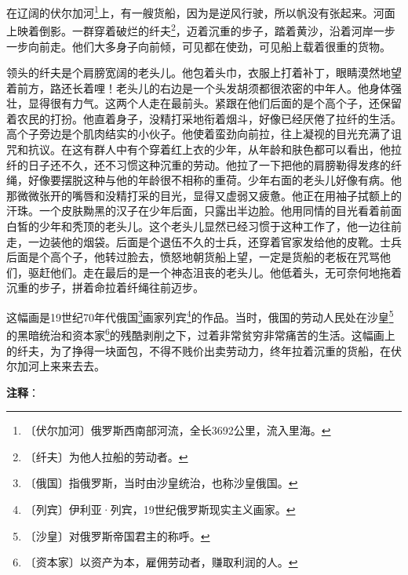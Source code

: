 \documentclass[12pt,UTF-8,openany]{ctexbook}
\begin{document}
\begin{Large}
    
    在辽阔的伏尔加河\footnote{〔伏尔加河〕俄罗斯西南部河流，全长3692公里，流入里海。}上，有一艘货船，因为是逆风行驶，所以帆没有张起来。河面上映着倒影。一群穿着破烂的纤夫\footnote{〔纤夫〕为他人拉船的劳动者。}，迈着沉重的步子，踏着黄沙，沿着河岸一步一步向前走。他们大多身子向前倾，可见都在使劲，可见船上载着很重的货物。
    
    领头的纤夫是个肩膀宽阔的老头儿。他包着头巾，衣服上打着补丁，眼睛漠然地望着前方，路还长着哩！老头儿的右边是一个头发胡须都很浓密的中年人。他身体强壮，显得很有力气。这两个人走在最前头。紧跟在他们后面的是个高个子，还保留着农民的打扮。他直着身子，没精打采地衔着烟斗，好像已经厌倦了拉纤的生活。高个子旁边是个肌肉结实的小伙子。他使着蛮劲向前拉，往上凝视的目光充满了诅咒和抗议。在这有群人中有个穿着红上衣的少年，从年龄和肤色都可以看出，他拉纤的日子还不久，还不习惯这种沉重的劳动。他拉了一下把他的肩膀勒得发疼的纤绳，好像要摆脱这种与他的年龄很不相称的重荷。少年右面的老头儿好像有病。他那微微张开的嘴唇和没精打采的目光，显得又虚弱又疲惫。他正在用袖子拭额上的汗珠。一个皮肤黝黑的汉子在少年后面，只露出半边脸。他用同情的目光看着前面白皙的少年和秃顶的老头儿。这个老头儿显然已经习惯于这种工作了，他一边往前走，一边装他的烟袋。后面是个退伍不久的士兵，还穿着官家发给他的皮靴。士兵后面是个高个子，他转过脸去，愤怒地朝货船上望，一定是货船的老板在咒骂他们，驱赶他们。走在最后的是一个神态沮丧的老头儿。他低着头，无可奈何地拖着沉重的步子，拼着命拉着纤绳往前迈步。
    
    这幅画是19世纪70年代俄国\footnote{〔俄国〕指俄罗斯，当时由沙皇统治，也称沙皇俄国。}画家列宾\footnote{〔列宾〕伊利亚·列宾，19世纪俄罗斯现实主义画家。}的作品。当时，俄国的劳动人民处在沙皇\footnote{〔沙皇〕对俄罗斯帝国君主的称呼。}的黑暗统治和资本家\footnote{〔资本家〕以资产为本，雇佣劳动者，赚取利润的人。}的残酷剥削之下，过着非常贫穷非常痛苦的生活。这幅画上的纤夫，为了挣得一块面包，不得不贱价出卖劳动力，终年拉着沉重的货船，在伏尔加河上来来去去。
    
\end{Large}


\newpage

\textbf{注释}：

\vspace{-1em}
\end{document}

